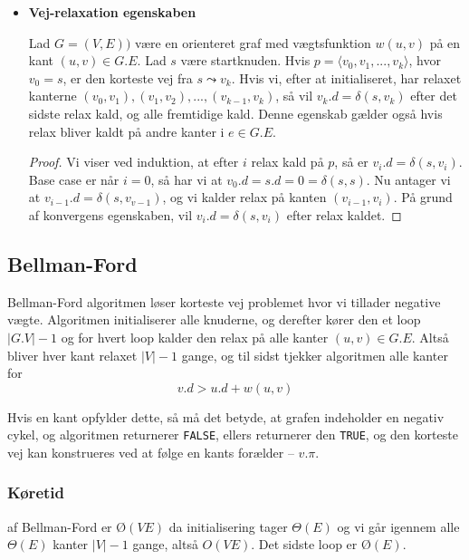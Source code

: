 \begin{itemize}
\item \textbf{Vej-relaxation egenskaben}
  \begin{lemma}
    Lad $G = (V,E))$ være en orienteret graf med vægtsfunktion $w(u,v)$ på en kant $(u,v) \in G.E$. Lad $s$ være startknuden. Hvis $p = \langle v_0, v_1, ..., v_k\rangle$, hvor $v_0 = s$, er den korteste vej fra $s \leadsto v_k$. Hvis vi, efter at initialiseret, har relaxet kanterne $(v_0, v_1), (v_1, v_2), ..., (v_{k-1}, v_k)$, så vil $v_k.d = \delta(s,v_k)$ efter det sidste relax kald, og alle fremtidige kald. Denne egenskab gælder også hvis relax bliver kaldt på andre kanter i $e \in G.E$.
  \end{lemma}

  \begin{proof}
    Vi viser ved induktion, at efter $i$ relax kald på $p$, så er $v_i.d = \delta(s,v_i)$.\\
    Base case er når $i=0$, så har vi at $v_0.d = s.d = 0 = \delta(s,s)$.
    Nu antager vi at $v_{i-1}.d = \delta(s, v_{v - 1})$, og vi kalder relax på kanten $(v_{i-1}, v_i)$. På grund af konvergens egenskaben, vil $v_i.d = \delta(s,v_i)$ efter relax kaldet.
  \end{proof}
\end{itemize}

\subsection{Bellman-Ford}
Bellman-Ford algoritmen løser korteste vej problemet hvor vi tillader negative vægte. Algoritmen initialiserer alle knuderne, og derefter kører den et loop $|G.V| - 1$ og for hvert loop kalder den relax på alle kanter $(u,v) \in G.E$. Altså bliver hver kant relaxet $|V| - 1$ gange, og til sidst tjekker algoritmen alle kanter for
$$v.d > u.d + w(u,v)$$

Hvis en kant opfylder dette, så må det betyde, at grafen indeholder en negativ cykel, og algoritmen returnerer \texttt{FALSE}, ellers returnerer den \texttt{TRUE}, og den korteste vej kan konstrueres ved at følge en kants forælder -- $v.\pi$.\\

\subsubsection{Køretid}
af Bellman-Ford er $Ø(VE)$ da initialisering tager $\Theta(E)$ og vi går igennem alle $\Theta(E)$ kanter $|V| - 1$ gange, altså $O(VE)$. Det sidste loop er $Ø(E)$.\\


